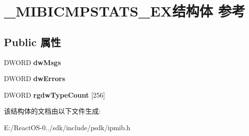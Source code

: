 \hypertarget{struct___m_i_b_i_c_m_p_s_t_a_t_s___e_x}{}\section{\+\_\+\+M\+I\+B\+I\+C\+M\+P\+S\+T\+A\+T\+S\+\_\+\+E\+X结构体 参考}
\label{struct___m_i_b_i_c_m_p_s_t_a_t_s___e_x}
\subsection*{Public 属性}
\begin{DoxyCompactItemize}
\item 
\mbox{\label{struct___m_i_b_i_c_m_p_s_t_a_t_s___e_x_a37bcab96ebcecacfdd0dcf0eee12e021}} 
D\+W\+O\+RD {\bfseries dw\+Msgs}
\item 
\mbox{\label{struct___m_i_b_i_c_m_p_s_t_a_t_s___e_x_ae401c41fd34f76cf574534f2e86edc5e}} 
D\+W\+O\+RD {\bfseries dw\+Errors}
\item 
\mbox{\label{struct___m_i_b_i_c_m_p_s_t_a_t_s___e_x_a956ed9a61c8db1a77ea2e1a1cc01a535}} 
D\+W\+O\+RD {\bfseries rgdw\+Type\+Count} \mbox{[}256\mbox{]}
\end{DoxyCompactItemize}


该结构体的文档由以下文件生成\+:\begin{DoxyCompactItemize}
\item 
E\+:/\+React\+O\+S-\/0../sdk/include/psdk/ipmib.\+h\end{DoxyCompactItemize}
